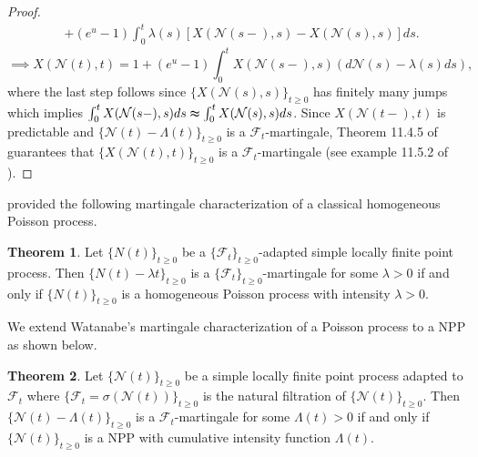 \documentclass[11pt,oneside,reqno]{amsart}
\theoremstyle{definition}
\newtheorem{theorem}{\bf Theorem}[section]
\theoremstyle{remarkstyle}
\begin{document}
\begin{proof}
\begin{align}
       &+(e^u-1)\int_{0}^{t}\lambda(s)\left[X(\mathcal{N}(s-),s)-X(\mathcal{N}(s),s)\right]ds.\nonumber
    \end{align}
    \begin{equation}
        \implies X(\mathcal{N}(t),t)=1+(e^u-1)\int_{0}^{t}X(\mathcal{N}(s-),s)\left(d\mathcal{N}(s)-\lambda(s)ds\right),\nonumber
    \end{equation}
    where the last step follows since $\{X(\mathcal{N}(s),s)\}_{t\ge 0}$ has finitely many jumps which implies $\int_{0}^{t}X(\mathcal{N}(s-),s)ds\thickapprox \int_{0}^{t}X(\mathcal{N}(s),s)ds$. Since $X(\mathcal{N}(t-),t)$ is predictable and $\{\mathcal{N}(t)-\Lambda(t)\}_{t\ge 0}$ is a $\mathcal{F}_t$-martingale, Theorem 11.4.5 of \citet{Shreve2004} guarantees that $\{X(\mathcal{N}(t),t)\}_{t\ge 0}$ is a $\mathcal{F}_t$-martingale (see example 11.5.2 of \citet{Shreve2004}).
\end{proof}
\citet{Watanabe1964} provided the following martingale characterization of a classical homogeneous Poisson process.

\begin{theorem}
Let $\{N(t)\}_{t \ge 0}$ be a $\{\mathcal{F}_t\}_{t \ge 0}$-adapted simple locally finite point process. Then 
$\{N(t) - \lambda t\}_{t \ge 0}$ is a $\{\mathcal{F}_t\}_{t \ge 0}$-martingale for some $\lambda > 0$ if and only if 
$\{N(t)\}_{t \ge 0}$ is a homogeneous Poisson process with intensity $\lambda > 0$.
\end{theorem}

We extend Watanabe's martingale characterization of a Poisson process to a NPP as shown below. 
\begin{theorem}\label{watanabe_npp}
Let $\{\mathcal{N}(t)\}_{t\ge 0}$ be a simple locally finite point process adapted to $\mathcal{F}_t$ where $\{\mathcal{F}_t=\sigma(\mathcal{N}(t))\}_{t\ge 0}$ is the natural filtration of $\{\mathcal{N}(t)\}_{t\ge 0}$. Then $\{\mathcal{N}(t)-\Lambda(t)\}_{t\ge 0}$ is a $\mathcal{F}_t$-martingale for some $\Lambda(t)>0$ if and only if $\{\mathcal{N}(t)\}_{t\ge 0}$ is a NPP with cumulative intensity function $\Lambda(t)$. 
\end{theorem}
\end{document}
